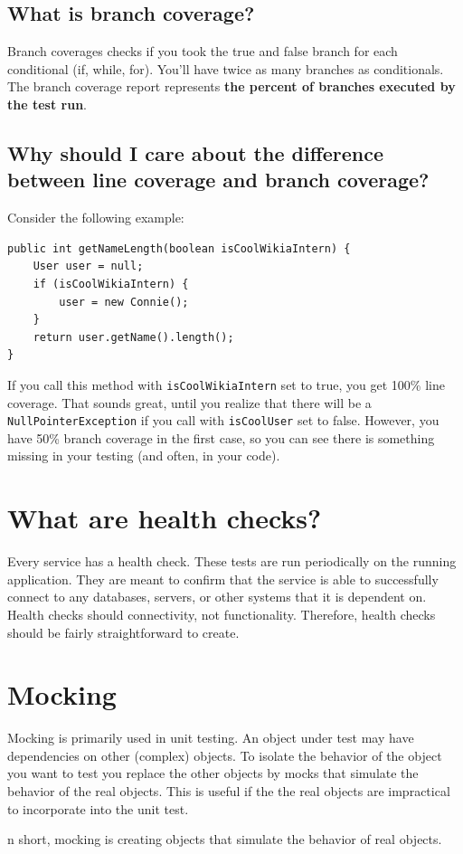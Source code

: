 \documentclass[oneside]{book}
\begin{document}
\subsection{What is branch coverage?}
Branch coverages checks if you took the true and false branch for each conditional (if, while, for). You'll have twice as many branches as conditionals. The branch coverage report represents \textbf{the percent of branches executed by the test run}.
\subsection{Why should I care about the difference between line coverage and branch coverage?}
Consider the following example: \\
\begin{lstlisting}
public int getNameLength(boolean isCoolWikiaIntern) {
    User user = null;
    if (isCoolWikiaIntern) {
        user = new Connie(); 
    }
    return user.getName().length(); 
}
\end{lstlisting}
If you call this method with \texttt{isCoolWikiaIntern} set to true, you get 100\% line coverage. That sounds great, until you realize that there will be a \texttt{NullPointerException} if you call with \texttt{isCoolUser} set to false. However, you have 50\% branch coverage in the first case, so you can see there is something missing in your testing (and often, in your code).
\section{What are health checks?}
Every service has a health check. These tests are run periodically on the running application. They are meant to confirm that the service is able to successfully connect to any databases, servers, or other systems that it is dependent on. Health checks should connectivity, not functionality. Therefore, health checks should be fairly straightforward to create.
\section{Mocking}
Mocking is primarily used in unit testing. An object under test may have dependencies on other (complex) objects. To isolate the behavior of the object you want to test you replace the other objects by mocks that simulate the behavior of the real objects. This is useful if the the real objects are impractical to incorporate into the unit test.\par
n short, mocking is creating objects that simulate the behavior of real objects.
\end{document}

